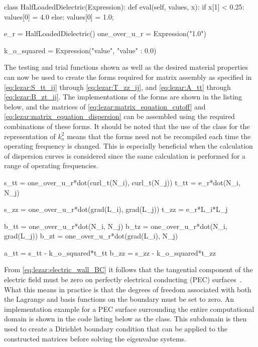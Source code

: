 \begin{python}
class HalfLoadedDielectric(Expression):
    def eval(self, values, x):
        if x[1] < 0.25:
            values[0] = 4.0
        else:
            values[0] = 1.0;

e_r = HalfLoadedDielectric()
one_over_u_r = Expression("1.0")

k_o_squared = Expression("value", {"value" : 0.0})
\end{python}

The testing and trial functions shown as well as the
desired material properties can now be used to create
the forms required for matrix assembly as specified in
\eqref{eq:lezar:S_tt_ij} through \eqref{eq:lezar:T_zz_ij}, and
\eqref{eq:lezar:A_tt} through \eqref{eq:lezar:B_zt_ij}. The
implementations of the forms are shown in the listing below,
and the matrices of \eqref{eq:lezar:matrix_equation_cutoff} and
\eqref{eq:lezar:matrix_equation_dispersion} can be assembled using the
required combinations of these forms. It should be noted that the use of
the  class for the representation of $k_o^2$ means that the forms need
not be recompiled each time the operating frequency is changed. This
is especially beneficial when the calculation of dispersion curves
is considered since the same calculation is performed for a range of
operating frequencies.

\begin{python}
s_tt = one_over_u_r*dot(curl_t(N_i), curl_t(N_j))
t_tt = e_r*dot(N_i, N_j)

s_zz = one_over_u_r*dot(grad(L_i), grad(L_j))
t_zz = e_r*L_i*L_j

b_tt = one_over_u_r*dot(N_i, N_j)
b_tz = one_over_u_r*dot(N_i, grad(L_j))
b_zt = one_over_u_r*dot(grad(L_i), N_j)

a_tt = s_tt - k_o_squared*t_tt
b_zz = s_zz - k_o_squared*t_zz
\end{python}

From \eqref{eq:lezar:electric_wall_BC} it follows that the tangential
component of the electric field must be zero on perfectly electrical
conducting (PEC) surfaces~\citep{Smith1997}. What this means in
practice is that the degrees of freedom associated with both the
Lagrange and \nedelec{} basis functions on the boundary must be set
to zero. An implementation example for a PEC surface surrounding the
entire computational domain is shown in the code listing below as the
 class. This subdomain is then used to create a
Dirichlet boundary condition that can be applied to the constructed
matrices before solving the eigenvalue systems.


